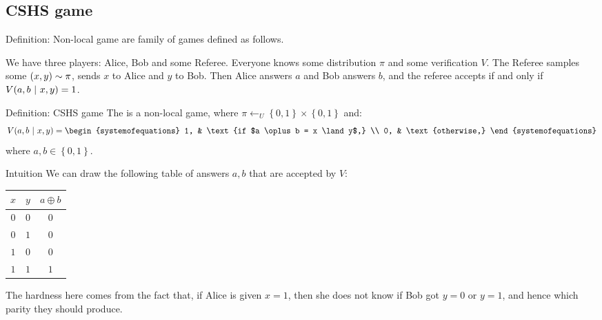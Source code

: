 \documentclass[a4paper]{article}
\begin{document}
\subsection{CSHS game}

\begin{parag}{Definition: Non-local game}
     are family of games defined as follows.

    We have three players: Alice, Bob and some Referee. Everyone knows some distribution $\pi$ and some verification $V$. The Referee samples some $\left(x, y\right) \followsdistr \pi$, sends $x$ to Alice and $y$ to Bob. Then Alice answers $a$ and Bob answers $b$, and the referee accepts if and only if $V\left(a, b \suchthat x, y\right) = 1$.
\end{parag}

\begin{parag}{Definition: CSHS game}
    The  is a non-local game, where $\pi \leftarrow_U \left\{0, 1\right\} \times \left\{0, 1\right\}$ and: 
    \[V\left(a, b \suchthat x, y\right) = \begin{systemofequations} 1, & \text{if $a \oplus b = x \land y$,} \\ 0, & \text{otherwise,} \end{systemofequations}\]
    where $a, b \in \left\{0, 1\right\}$.

    \begin{subparag}{Intuition}
        We can draw the following table of answers $a, b$ that are accepted by $V$:
        \begin{center}
        \begin{tabular}{|cc|c|}
            \hline
            $x$ & $y$ & $a \oplus b$ \\
            \hline
            $0$ & $0$ & $0$ \\
            $0$ & $1$ & $0$ \\
            $1$ & $0$ & $0$ \\
            $1$ & $1$ & $1$  \\
            \hline
        \end{tabular}
        \end{center}
        
        The hardness here comes from the fact that, if Alice is given $x = 1$, then she does not know if Bob got $y = 0$ or $y = 1$, and hence which parity they should produce.
    \end{subparag}
    
\end{parag}
\end{document}
